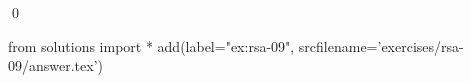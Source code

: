
\begin{ex} 
  \label{ex:rsa-09}
  
  \qed
\end{ex} 
\begin{python0}
from solutions import *
add(label="ex:rsa-09",
    srcfilename='exercises/rsa-09/answer.tex') 
\end{python0}
